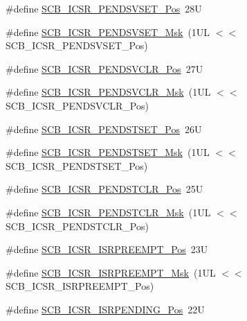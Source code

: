 \begin{DoxyCompactItemize}
\item 
\#define \mbox{\hyperlink{group___c_m_s_i_s___s_c_b_gab5ded23d2ab1d5ff7cc7ce746205e9fe}{S\+C\+B\+\_\+\+I\+C\+S\+R\+\_\+\+P\+E\+N\+D\+S\+V\+S\+E\+T\+\_\+\+Pos}}~28U
\item 
\#define \mbox{\hyperlink{group___c_m_s_i_s___s_c_b_ga1e40d93efb402763c8c00ddcc56724ff}{S\+C\+B\+\_\+\+I\+C\+S\+R\+\_\+\+P\+E\+N\+D\+S\+V\+S\+E\+T\+\_\+\+Msk}}~(1\+U\+L $<$$<$ S\+C\+B\+\_\+\+I\+C\+S\+R\+\_\+\+P\+E\+N\+D\+S\+V\+S\+E\+T\+\_\+\+Pos)
\item 
\#define \mbox{\hyperlink{group___c_m_s_i_s___s_c_b_gae218d9022288f89faf57187c4d542ecd}{S\+C\+B\+\_\+\+I\+C\+S\+R\+\_\+\+P\+E\+N\+D\+S\+V\+C\+L\+R\+\_\+\+Pos}}~27U
\item 
\#define \mbox{\hyperlink{group___c_m_s_i_s___s_c_b_ga4a901ace381d3c1c74ac82b22fae2e1e}{S\+C\+B\+\_\+\+I\+C\+S\+R\+\_\+\+P\+E\+N\+D\+S\+V\+C\+L\+R\+\_\+\+Msk}}~(1\+U\+L $<$$<$ S\+C\+B\+\_\+\+I\+C\+S\+R\+\_\+\+P\+E\+N\+D\+S\+V\+C\+L\+R\+\_\+\+Pos)
\item 
\#define \mbox{\hyperlink{group___c_m_s_i_s___s_c_b_ga9dbb3358c6167c9c3f85661b90fb2794}{S\+C\+B\+\_\+\+I\+C\+S\+R\+\_\+\+P\+E\+N\+D\+S\+T\+S\+E\+T\+\_\+\+Pos}}~26U
\item 
\#define \mbox{\hyperlink{group___c_m_s_i_s___s_c_b_ga7325b61ea0ec323ef2d5c893b112e546}{S\+C\+B\+\_\+\+I\+C\+S\+R\+\_\+\+P\+E\+N\+D\+S\+T\+S\+E\+T\+\_\+\+Msk}}~(1\+U\+L $<$$<$ S\+C\+B\+\_\+\+I\+C\+S\+R\+\_\+\+P\+E\+N\+D\+S\+T\+S\+E\+T\+\_\+\+Pos)
\item 
\#define \mbox{\hyperlink{group___c_m_s_i_s___s_c_b_gadbe25e4b333ece1341beb1a740168fdc}{S\+C\+B\+\_\+\+I\+C\+S\+R\+\_\+\+P\+E\+N\+D\+S\+T\+C\+L\+R\+\_\+\+Pos}}~25U
\item 
\#define \mbox{\hyperlink{group___c_m_s_i_s___s_c_b_gab241827d2a793269d8cd99b9b28c2157}{S\+C\+B\+\_\+\+I\+C\+S\+R\+\_\+\+P\+E\+N\+D\+S\+T\+C\+L\+R\+\_\+\+Msk}}~(1\+U\+L $<$$<$ S\+C\+B\+\_\+\+I\+C\+S\+R\+\_\+\+P\+E\+N\+D\+S\+T\+C\+L\+R\+\_\+\+Pos)
\item 
\#define \mbox{\hyperlink{group___c_m_s_i_s___s_c_b_ga11cb5b1f9ce167b81f31787a77e575df}{S\+C\+B\+\_\+\+I\+C\+S\+R\+\_\+\+I\+S\+R\+P\+R\+E\+E\+M\+P\+T\+\_\+\+Pos}}~23U
\item 
\#define \mbox{\hyperlink{group___c_m_s_i_s___s_c_b_gaa966600396290808d596fe96e92ca2b5}{S\+C\+B\+\_\+\+I\+C\+S\+R\+\_\+\+I\+S\+R\+P\+R\+E\+E\+M\+P\+T\+\_\+\+Msk}}~(1\+U\+L $<$$<$ S\+C\+B\+\_\+\+I\+C\+S\+R\+\_\+\+I\+S\+R\+P\+R\+E\+E\+M\+P\+T\+\_\+\+Pos)
\item 
\#define \mbox{\hyperlink{group___c_m_s_i_s___s_c_b_ga10749d92b9b744094b845c2eb46d4319}{S\+C\+B\+\_\+\+I\+C\+S\+R\+\_\+\+I\+S\+R\+P\+E\+N\+D\+I\+N\+G\+\_\+\+Pos}}~22U
$$
\end{DoxyCompactItemize}
